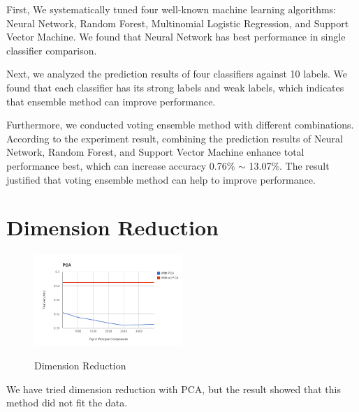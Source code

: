 \documentclass{acm_proc_article-sp}
\begin{document}
First, We systematically tuned four well-known machine learning algorithms: Neural Network, Random Forest, Multinomial Logistic Regression, and Support Vector Machine. We found that Neural Network has best performance in single classifier comparison.

Next, we analyzed the prediction results of four classifiers against 10 labels. We found that each classifier has its strong labels and weak labels, which indicates that ensemble method can improve performance.

Furthermore, we conducted voting ensemble method with different combinations. According to the experiment result, combining the prediction results of Neural Network, Random Forest, and Support Vector Machine enhance total performance best, which can increase accuracy 0.76\% $\sim$ 13.07\%. The result justified that voting ensemble method can help to improve performance. 


%

%
%

\appendix

\section{Dimension Reduction}


\begin{figure}[h!]
  \caption{Dimension Reduction}
  \centering
    \includegraphics[width=0.5\textwidth]{pic/pca}
    \label{pca}
\end{figure}

We have tried dimension reduction with PCA, but the result showed that this method did not fit the data.
\end{document}
